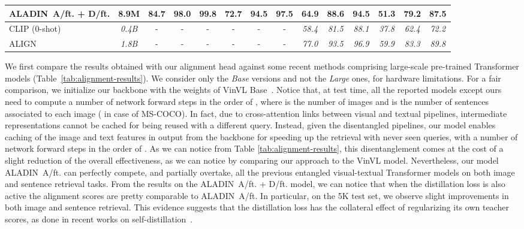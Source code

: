 \documentclass[sigconf]{acmart}
\newcommand{\ourmodel}{ALADIN}    \settopmatter{authorsperrow=4}
\begin{document}
\begin{table*}[htbp]
\begin{center}
\begin{tabular}{Lccccccccccccc}
\textbf{\ourmodel\ A/ft. + D/ft.} & 8.9M & 84.7 & 98.0 & \textbf{99.8} & \textbf{72.7} & \textbf{94.5} & \textbf{97.5} & \textbf{64.9} & \textbf{88.6} & \textbf{94.5} & \textbf{51.3} & \textbf{79.2} & \textbf{87.5} \\
\midrule
\midrule
CLIP (0-shot)~\citep{radford2021learning} & \textit{0.4B} & - & - & - & - & - & - & \textit{58.4} & \textit{81.5} & \textit{88.1} & \textit{37.8} & \textit{62.4} & \textit{72.2} \\
ALIGN~\citep{jia2021scaling} & \textit{1.8B} & - & - & - & - & - & - & \textit{77.0} & \textit{93.5} & \textit{96.9} & \textit{59.9} & \textit{83.3} & \textit{89.8} \\
\bottomrule
\end{tabular}
\label{tab:matching-results}
\end{center}
\end{table*}

We first compare the results obtained with our alignment head against some recent methods comprising large-scale pre-trained Transformer models (Table~\ref{tab:alignment-results}). We consider only the \textit{Base} versions and not the \textit{Large} ones, for hardware limitations. For a fair comparison, we initialize our backbone with the weights of VinVL Base~\citep{zhang2021vinvl}. Notice that, at test time, all the reported models except ours need to compute a number of network forward steps in the order of , where  is the number of images and  is the number of sentences associated to each image ( in case of MS-COCO). In fact, due to cross-attention links between visual and textual pipelines, intermediate representations cannot be cached for being reused with a different query. Instead, given the disentangled pipelines, our model enables caching of the image and text features in output from the backbone for speeding up the retrieval with never seen queries, with a number of network forward steps in the order of . As we can notice from Table \ref{tab:alignment-results}, this disentanglement comes at the cost of a slight reduction of the overall effectiveness, as we can notice by comparing our approach to the VinVL model. Nevertheless, our model \ourmodel\ A/ft. can perfectly compete, and partially overtake, all the previous entangled visual-textual Transformer models on both image and sentence retrieval tasks. From the results on the \ourmodel\ A/ft. + D/ft. model, we can notice that when the distillation loss is also active the alignment scores are pretty comparable to \ourmodel\ A/ft. In particular, on the 5K test set, we observe slight improvements in both image and sentence retrieval. This evidence suggests that the distillation loss has the collateral effect of regularizing its own teacher scores, as done in recent works on self-distillation~\citep{zhang2019your,caron2021emerging}.
\end{document}
